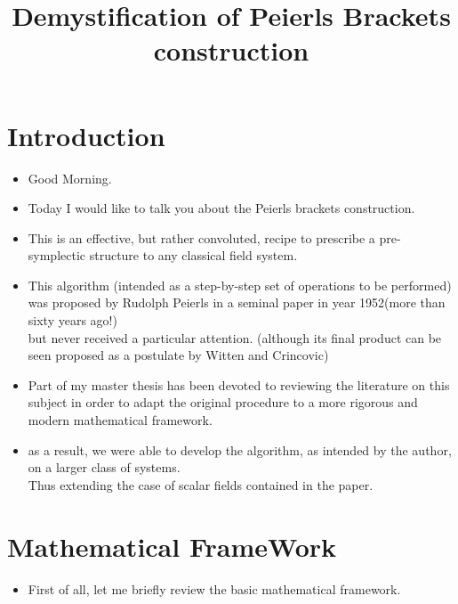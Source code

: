 \documentclass[a4paper,11pt]{scrartcl}
\title{Demystification of Peierls Brackets construction}
\author{\vspace{-5ex}}
\date{\vspace{-5ex}} %
\begin{document}

    \maketitle
    \tableofcontents

    \newpage
    \section{Introduction}
    \begin{itemize}
        \item Good Morning.
        \item Today I would like to talk you about the Peierls brackets construction.
        \item This is an effective, but rather convoluted, recipe to prescribe a pre-symplectic structure to any classical field system.
        \item This algorithm (intended as a step-by-step set of operations to be performed) was proposed by Rudolph Peierls in a seminal paper in year 1952(more than sixty years ago!) \\
        but never received a particular attention.
        (although its final product can be seen proposed as a postulate by Witten and Crincovic)
        \item Part of my master thesis has been devoted to reviewing the literature on this subject in order to adapt the original procedure to a more rigorous and modern mathematical framework.
        \item as a result, we were able to develop the algorithm, as intended by the author, on a larger class of systems.\\
        Thus extending the case of scalar fields contained in the paper.
    \end{itemize}

    \newpage
    \section{Mathematical FrameWork}
    \begin{itemize}
        \item First of all, let me briefly review the basic mathematical framework.
    \end{itemize}
\end{document}
